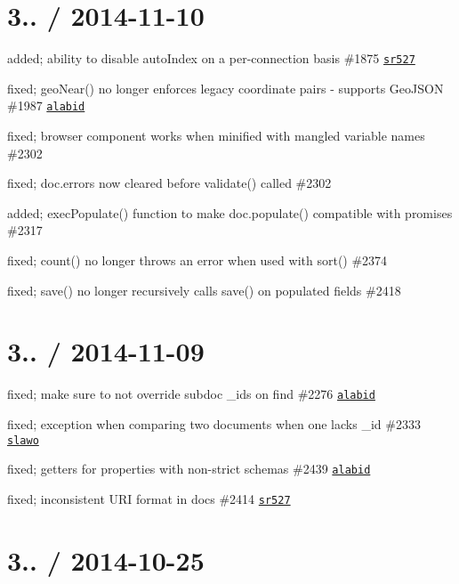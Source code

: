 \section*{3.. / 2014-\/11-\/10 }


\begin{DoxyItemize}
\item added; ability to disable auto\+Index on a per-\/connection basis \#1875 \href{https://github.com/sr527}{\tt sr527}
\item fixed; {\ttfamily geo\+Near()} no longer enforces legacy coordinate pairs -\/ supports Geo\+J\+S\+ON \#1987 \href{https://github.com/alabid}{\tt alabid}
\item fixed; browser component works when minified with mangled variable names \#2302
\item fixed; {\ttfamily doc.\+errors} now cleared before {\ttfamily validate()} called \#2302
\item added; {\ttfamily exec\+Populate()} function to make {\ttfamily doc.\+populate()} compatible with promises \#2317
\item fixed; {\ttfamily count()} no longer throws an error when used with {\ttfamily sort()} \#2374
\item fixed; {\ttfamily save()} no longer recursively calls {\ttfamily save()} on populated fields \#2418
\end{DoxyItemize}

\section*{3.. / 2014-\/11-\/09 }


\begin{DoxyItemize}
\item fixed; make sure to not override subdoc \+\_\+ids on find \#2276 \href{https://github.com/alabid}{\tt alabid}
\item fixed; exception when comparing two documents when one lacks \+\_\+id \#2333 \href{https://github.com/slawo}{\tt slawo}
\item fixed; getters for properties with non-\/strict schemas \#2439 \href{https://github.com/alabid}{\tt alabid}
\item fixed; inconsistent U\+RI format in docs \#2414 \href{https://github.com/sr527}{\tt sr527}
\end{DoxyItemize}

\section*{3.. / 2014-\/10-\/25 }


